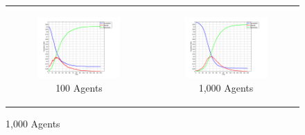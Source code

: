 \begin{figure}
\begin{center}
	\begin{tabular}{c c}
		\begin{subfigure}[b]{0.3\textwidth}
			\centering
			\includegraphics[width=1\textwidth, angle=0]{./shared/fig/frabs/SIR_100agents_150t_01dt_NOSS_parallel_10replications.png}
			\caption{100 Agents}
			\label{fig:sir_abs_agents_repls_100}
		\end{subfigure}
    	&
		\begin{subfigure}[b]{0.3\textwidth}
			\centering
			\includegraphics[width=1\textwidth, angle=0]{./shared/fig/frabs/SIR_1000agents_150t_01dt_NOSS_parallel_10replications.png}
			\caption{1,000 Agents}
			\label{fig:sir_abs_agents_repls_1000}
		\end{subfigure}
    	

\end{tabular}
\end{center}
\end{figure}
